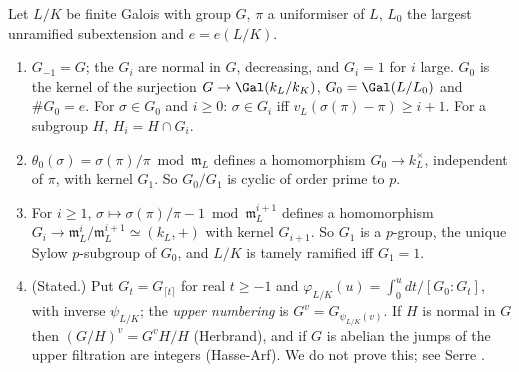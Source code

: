 \begin{proposition}\label{prop:local:ramgroups}
Let $L/K$ be finite Galois with group $G$, $\pi$ a uniformiser of $L$, $L_0$ the largest unramified subextension and $e=e(L/K)$.
\begin{enumerate}[label=(\roman*)]
\item $G_{-1}=G$; the $G_i$ are normal in $G$, decreasing, and $G_i=1$ for $i$ large. $G_0$ is the kernel of the surjection $G\to\Gal(k_L/k_K)$,
$G_0=\Gal(L/L_0)$ and $\#G_0=e$. For $\sigma\in G_0$ and $i\ge0$: $\sigma\in G_i$ iff $v_L(\sigma(\pi)-\pi)\ge i+1$. For a subgroup $H$, $H_i=H\cap G_i$.
\item $\theta_0(\sigma)=\sigma(\pi)/\pi\bmod\mathfrak m_L$ defines a homomorphism $G_0\to k_L^\times$, independent of $\pi$, with kernel $G_1$. So $G_0/G_1$ is cyclic
of order prime to $p$.
\item For $i\ge1$, $\sigma\mapsto\sigma(\pi)/\pi-1\bmod\mathfrak m_L^{i+1}$ defines a homomorphism $G_i\to\mathfrak m_L^i/\mathfrak m_L^{i+1}\simeq(k_L,+)$ with kernel
$G_{i+1}$. So $G_1$ is a $p$-group, the unique Sylow $p$-subgroup of $G_0$, and $L/K$ is tamely ramified iff $G_1=1$.
\item (Stated.) Put $G_t=G_{\lceil t\rceil}$ for real $t\ge-1$ and $\varphi_{L/K}(u)=\int_0^u dt/[G_0:G_t]$, with inverse $\psi_{L/K}$; the \emph{upper numbering}
is $G^v=G_{\psi_{L/K}(v)}$. If $H$ is normal in $G$ then $(G/H)^v=G^vH/H$ (Herbrand), and if $G$ is abelian the jumps of the upper filtration are
integers (Hasse-Arf). We do not prove this; see Serre \cite[Chapter IV, Section 3, and Chapter V, Section 7]{SerreLocalFields}.
\end{enumerate}
\end{proposition}

